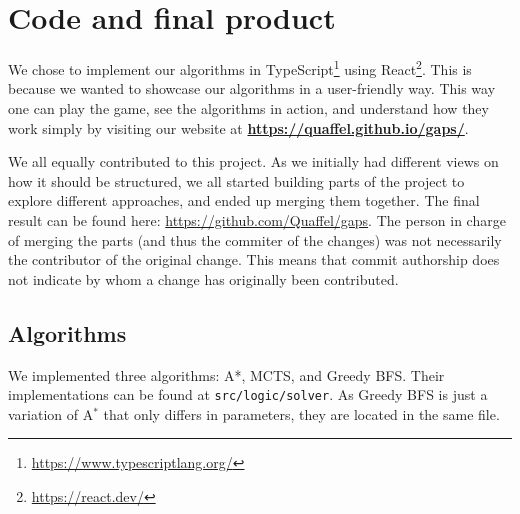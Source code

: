 \chapter{Code and final product}
We chose to implement our algorithms in TypeScript\footnote{\url{https://www.typescriptlang.org/}} using React\footnote{\url{https://react.dev/}}. This is because we wanted to showcase our algorithms in a user-friendly way. This way one can play the game, see the algorithms in action, and understand how they work simply by visiting our website at \textbf{\url{https://quaffel.github.io/gaps/}}.

We all equally contributed to this project. As we initially had different views on how it should be structured, we all started building parts of the project to explore different approaches, and ended up merging them together.
The final result can be found here: \url{https://github.com/Quaffel/gaps}. The person in charge of merging the parts (and thus the commiter of the changes) was not necessarily the contributor of the original change.
This means that commit authorship does not indicate by whom a change has originally been contributed.

\section{Algorithms}
We implemented three algorithms: A*, MCTS, and Greedy BFS. 
Their implementations can be found at \texttt{src/logic/solver}.
As Greedy BFS is just a variation of A$^*$ that only differs in parameters, they are located in the same file.


